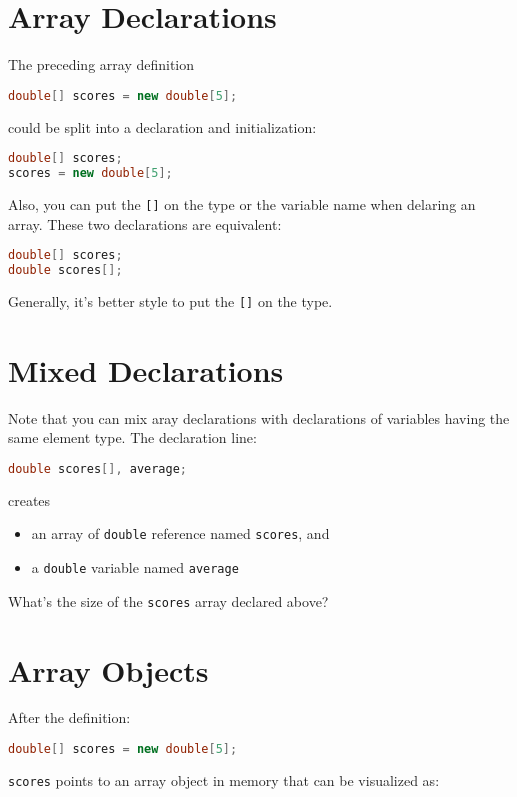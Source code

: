 \documentclass{article}
\begin{document}
\section{Array Declarations}


The preceding array definition
\begin{lstlisting}[language=Java]
double[] scores = new double[5];
\end{lstlisting}
could be split into a declaration and initialization:
\begin{lstlisting}[language=Java]
double[] scores;
scores = new double[5];
\end{lstlisting}
Also, you can put the {\tt []} on the type or the variable name when delaring an array.  These two declarations are equivalent:
\begin{lstlisting}[language=Java]
double[] scores;
double scores[];
\end{lstlisting}
Generally, it's better style to put the {\tt []} on the type.



\section{Mixed Declarations}


Note that you can mix aray declarations with declarations of variables having the same element type.  The declaration line:
\begin{lstlisting}[language=Java]
double scores[], average;
\end{lstlisting}
creates
\begin{itemize}
\item an array of {\tt double} reference named {\tt scores}, and
\item a {\tt double} variable named {\tt average}
\end{itemize}

What's the size of the {\tt scores} array declared above?


\section{Array Objects}


After the definition:
\begin{lstlisting}[language=Java]
double[] scores = new double[5];
\end{lstlisting}
{\tt scores} points to an array object in memory that can be visualized as:\\
\end{document}

